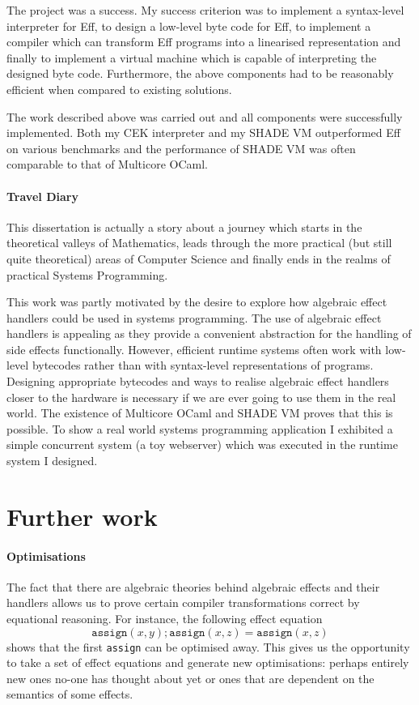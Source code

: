 \documentclass[class=article, crop=false]{standalone}
\begin{document}
The project was a success. My success criterion was to implement a 
syntax-level interpreter for Eff, to design a low-level byte code for Eff,
to implement a compiler which can transform Eff programs into a linearised
representation and finally to implement a virtual machine which is capable of
interpreting the designed byte code. Furthermore, the above components had to be
reasonably efficient when compared to existing solutions.

The work described above was carried out and all components were successfully
implemented. Both my CEK interpreter and my SHADE VM outperformed Eff on various
benchmarks and the performance of SHADE VM was often comparable to that of
Multicore OCaml.

\paragraph{Travel Diary}

This dissertation is actually a story about a journey
which starts in the theoretical valleys of Mathematics, leads through the more
practical (but still quite theoretical) areas of Computer Science and finally
ends in the realms of practical Systems Programming.

This work was partly motivated by the desire to explore how algebraic effect
handlers could be used in systems programming. The use of algebraic effect
handlers is appealing as they provide a convenient abstraction for the handling
of side effects functionally. However, efficient runtime systems often work
with low-level bytecodes rather than with syntax-level representations of
programs. Designing appropriate bytecodes and ways to realise algebraic effect
handlers closer to the hardware is necessary if we are ever
going to use them in the real world. The existence of Multicore OCaml and SHADE VM
proves that this is possible. To show a real world systems programming application
I exhibited a simple concurrent system (a toy webserver) which was executed
in the runtime system I designed. 

\section{Further work}

\paragraph{Optimisations}
The fact that there are algebraic theories behind algebraic effects and their
handlers allows us to prove certain compiler transformations correct by
equational reasoning. For instance, the following effect equation
$$\mathtt{assign}(x,y); \mathtt{assign}(x,z) = \mathtt{assign}(x, z)$$
shows that the first \texttt{assign} can be optimised away.
This gives us the opportunity to take a set of effect
equations and generate new optimisations: perhaps entirely new ones no-one has
thought about yet or ones that are dependent on the semantics of some effects.
\end{document}
